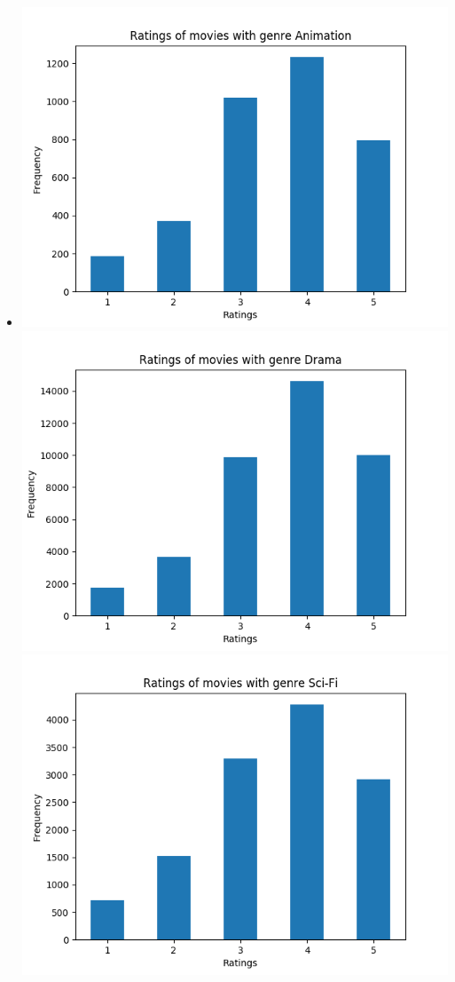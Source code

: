 \begin{itemize}
    \item {}

        \includegraphics[scale=.25]{basics_genre_Animation.png}
        \includegraphics[scale=.25]{basics_genre_Drama.png}
        \includegraphics[scale=.25]{basics_genre_Sci-Fi.png}


\end{itemize}

